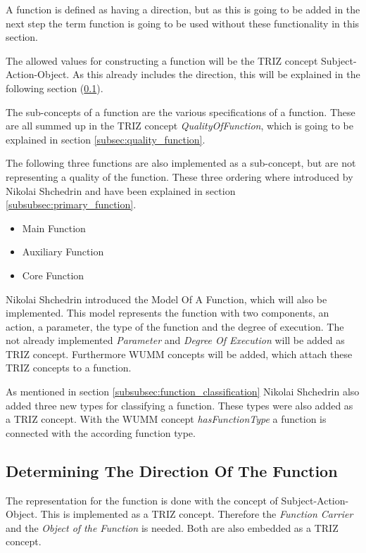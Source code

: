 \documentclass[11pt,a4paper]{article}
\begin{document}
A function is defined as having a direction, but as this is going to be added
in the next step the term function is going to be used without these
functionality in this section.

The allowed values for constructing a function will be the TRIZ concept
Subject-Action-Object.  As this already includes the direction, this will be
explained in the following section (\ref{subsec:direction_function}).

The sub-concepts of a function are the various specifications of a function.
These are all summed up in the TRIZ concept \textit{QualityOfFunction}, which
is going to be explained in section \ref{subsec:quality_function}.

The following three functions are also implemented as a sub-concept, but are
not representing a quality of the function.  These three ordering where
introduced by Nikolai Shchedrin and have been explained in section
\ref{subsubsec:primary_function}.

\begin{itemize}
\item Main Function
\item Auxiliary Function
\item Core Function
\end{itemize}

Nikolai Shchedrin introduced the Model Of A Function, which will also be
implemented.  This model represents the function with two components, an
action, a parameter, the type of the function and the degree of execution.
The not already implemented \textit{Parameter} and \textit{Degree Of
  Execution} will be added as TRIZ concept.  Furthermore WUMM concepts will be
added, which attach these TRIZ concepts to a function.

As mentioned in section \ref{subsubsec:function_classification} Nikolai
Shchedrin also added three new types for classifying a function.  These types
were also added as a TRIZ concept.  With the WUMM concept
\textit{hasFunctionType} a function is connected with the according function
type.

\subsection{Determining The Direction Of The Function}
\label{subsec:direction_function}

The representation for the function is done with the concept of
Subject-Action-Object.  This is implemented as a TRIZ concept.  Therefore the
\textit{Function Carrier} and the \textit{Object of the Function} is needed.
Both are also embedded as a TRIZ concept.
\end{document}
